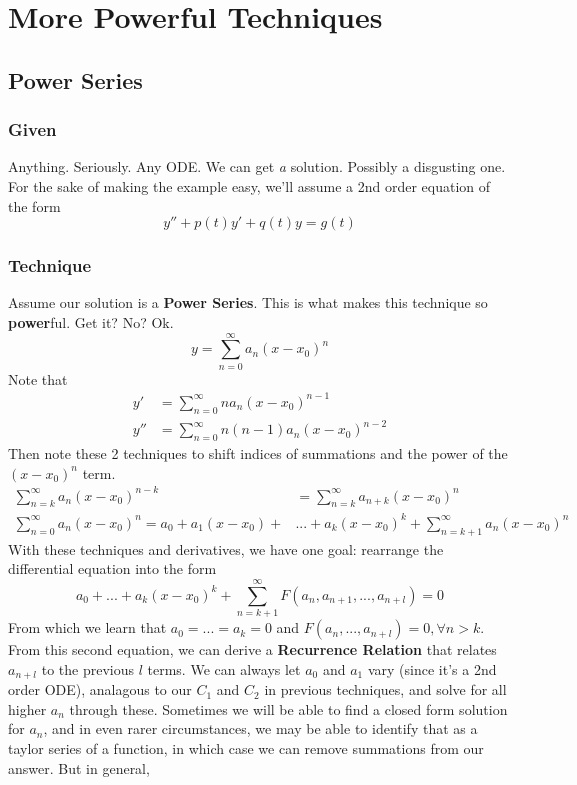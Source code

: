 \documentclass[11pt]{article}
\begin{document}
\section{More Powerful Techniques}
\subsection{Power Series}
\subsubsection{Given}
Anything. Seriously. Any ODE. We can get \textit{a} solution. Possibly a disgusting one. For the
sake of making the example easy, we'll assume a 2nd order equation of the form
    \[ y'' + p(t)y' + q(t)y = g(t) \] 
\subsubsection{Technique}
Assume our solution is a \textbf{Power Series}. This is what makes this technique so \textbf{power}ful.
Get it? No? Ok. 
    \[ y = \sum_{n=0}^{\infty}a_n(x - x_0)^n \]
Note that 
\begin{align*}
    y' &= \sum_{n=0}^{\infty}na_n(x - x_0)^{n-1} \\
    y'' &= \sum_{n=0}^{\infty}n(n-1)a_n(x - x_0)^{n-2}
\end{align*}
Then note these 2 techniques to shift indices of summations and the power of the $(x-x_0)^n$ term.
\begin{align}
    \sum_{n=k}^{\infty} a_n (x - x_0)^{n-k} &= \sum_{n=k}^{\infty} a_{n+k} (x - x_0)^n \\
    \sum_{n=0}^{\infty} a_n (x - x_0)^n = a_0 + a_1(x - x_0) + &... + a_k(x - x_0)^k + \sum_{n=k+1}^{\infty} a_n (x - x_0)^n
\end{align}
With these techniques and derivatives, we have one goal: rearrange the differential equation into the 
form
\[ a_0 + ... + a_k(x - x_0)^k + \sum_{n=k+1}^{\infty} F(a_n, a_{n+1}, ..., a_{n+l}) = 0 \]
From which we learn that $a_0 = ... = a_k = 0$ and $F(a_n,..., a_{n+l}) = 0, \forall n > k$. From this
second equation, we can derive a \textbf{Recurrence Relation} that relates $a_{n+l}$ to the previous 
$l$ terms. 
We can always let $a_0$ and $a_1$ vary (since it's a 2nd order ODE), analagous to our $C_1$ and $C_2$ 
in previous techniques, and solve for all higher $a_n$ through these. Sometimes we will be able to 
find a closed form solution for $a_n$, and in even rarer circumstances, we may be able to identify that 
as a taylor series of a function, in which case we can remove summations from our answer. But in general, 
\end{document}

